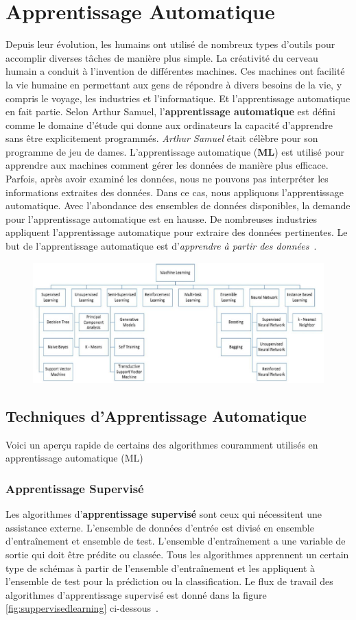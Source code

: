 \section{Apprentissage Automatique}
Depuis leur évolution, les humains ont utilisé de nombreux types d'outils pour accomplir diverses tâches de manière plus simple. La créativité du cerveau humain a conduit à l'invention de différentes machines. Ces machines ont facilité la vie humaine en permettant aux gens de répondre à divers besoins de la vie, y compris le voyage, les industries et l'informatique. Et l'apprentissage automatique en fait partie. Selon Arthur Samuel, l'\textbf{apprentissage automatique} est défini comme le domaine d'étude qui donne aux ordinateurs la capacité d'apprendre sans être explicitement programmés. \textit{Arthur Samuel} était célèbre pour son programme de jeu de dames. L'apprentissage automatique (\textbf{ML}) est utilisé pour apprendre aux machines comment gérer les données de manière plus efficace. Parfois, après avoir examiné les données, nous ne pouvons pas interpréter les informations extraites des données. Dans ce cas, nous appliquons l'apprentissage automatique. Avec l'abondance des ensembles de données disponibles, la demande pour l'apprentissage automatique est en hausse. De nombreuses industries appliquent l'apprentissage automatique pour extraire des données pertinentes. Le but de l'apprentissage automatique est d'\textit{apprendre à partir des données}~\cite{Machine2020Batta}.
\begin{figure}[!h]
	\centering
	\includegraphics[width=0.7\linewidth]{images/machineLearningType}
	\caption{}
	\label{fig:machinelearningtype}
\end{figure}

\subsection{Techniques d'Apprentissage Automatique}
Voici un aperçu rapide de certains des algorithmes couramment utilisés en apprentissage automatique (ML)
\subsubsection{Apprentissage Supervisé}
Les algorithmes d'\textbf{apprentissage supervisé} sont ceux qui nécessitent une assistance externe. L'ensemble de données d'entrée est divisé en ensemble d'entraînement et ensemble de test. L'ensemble d'entraînement a une variable de sortie qui doit être prédite ou classée. Tous les algorithmes apprennent un certain type de schémas à partir de l'ensemble d'entraînement et les appliquent à l'ensemble de test pour la prédiction ou la classification. Le flux de travail des algorithmes d'apprentissage supervisé est donné dans la figure \ref{fig:suppervisedlearning} ci-dessous~\cite{Machine2020Batta}.

